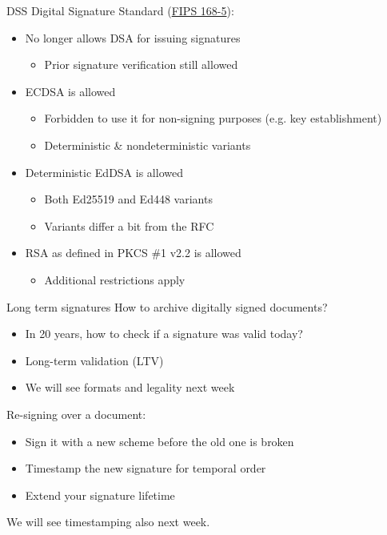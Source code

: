 \begin{frame}{DSS}
  Digital Signature Standard (\href{https://csrc.nist.gov/pubs/fips/186-5/final}{FIPS 168-5}):
  \begin{itemize}[<+(1)->]
    \item No longer allows DSA for issuing signatures
    \begin{itemize}
      \item Prior signature verification still allowed
    \end{itemize}
    \item ECDSA is allowed
    \begin{itemize}
      \item Forbidden to use it for non-signing purposes (e.g. key establishment)
      \item Deterministic \& nondeterministic variants
    \end{itemize}
    \item Deterministic EdDSA is allowed
    \begin{itemize}
      \item Both Ed25519 and Ed448 variants
      \item Variants differ a bit from the RFC
    \end{itemize}
    \item RSA as defined in PKCS \#1 v2.2 is allowed
    \begin{itemize}
      \item Additional restrictions apply
    \end{itemize}
  \end{itemize}
\end{frame}

\begin{frame}{Long term signatures}
  How to archive digitally signed documents?
  \begin{itemize}[<+(1)->]
    \item In 20 years, how to check if a signature was valid today?
    \item Long-term validation (LTV)
    \item We will see formats and legality next week
  \end{itemize}

  \pause
  Re-signing over a document:
  \begin{itemize}[<+(1)->]
    \item Sign it with a new scheme before the old one is broken
    \item Timestamp the new signature for temporal order
    \item Extend your signature lifetime
  \end{itemize}

  \pause
  We will see timestamping also next week.
\end{frame}


